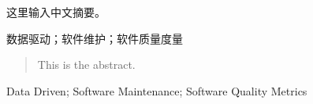 

\begin{zhaiyao}

	这里输入中文摘要。
\end{zhaiyao}




\begin{guanjianci}
	数据驱动；软件维护；软件质量度量
\end{guanjianci}



\begin{abstract}


	This is the abstract.

\end{abstract}



\begin{keywords}
	Data Driven; Software Maintenance; Software Quality Metrics
\end{keywords}